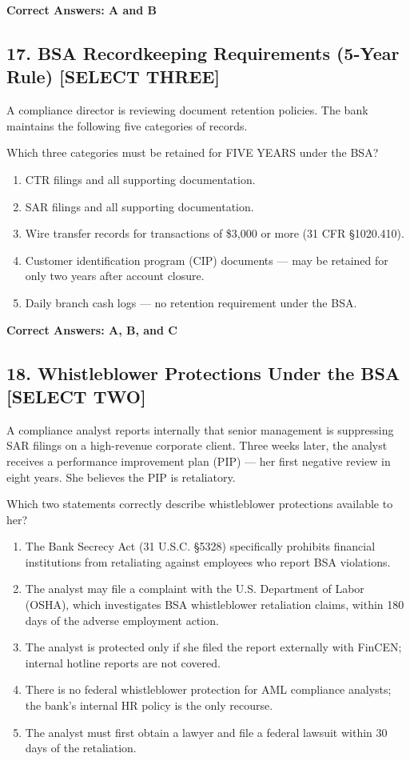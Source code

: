 \documentclass[11pt,a4paper]{article}
\begin{document}
	\textbf{Correct Answers: A and B}
	
	\subsection{17. BSA Recordkeeping Requirements (5-Year Rule) \textnormal{[SELECT THREE]}}
	
	A compliance director is reviewing document retention policies. The bank maintains the following five categories of records.
	
	Which three categories must be retained for FIVE YEARS under the BSA?
	
	\begin{enumerate}[label=\Alph*.]
		\item CTR filings and all supporting documentation.
		\item SAR filings and all supporting documentation.
		\item Wire transfer records for transactions of \$3,000 or more (31 CFR \S 1020.410).
		\item Customer identification program (CIP) documents — may be retained for only two years after account closure.
		\item Daily branch cash logs — no retention requirement under the BSA.
	\end{enumerate}
	
	\textbf{Correct Answers: A, B, and C}
	
	\subsection{18. Whistleblower Protections Under the BSA \textnormal{[SELECT TWO]}}
	
	A compliance analyst reports internally that senior management is suppressing SAR filings on a high-revenue corporate client. Three weeks later, the analyst receives a performance improvement plan (PIP) — her first negative review in eight years. She believes the PIP is retaliatory.
	
	Which two statements correctly describe whistleblower protections available to her?
	
	\begin{enumerate}[label=\Alph*.]
		\item The Bank Secrecy Act (31 U.S.C. \S 5328) specifically prohibits financial institutions from retaliating against employees who report BSA violations.
		\item The analyst may file a complaint with the U.S. Department of Labor (OSHA), which investigates BSA whistleblower retaliation claims, within 180 days of the adverse employment action.
		\item The analyst is protected only if she filed the report externally with FinCEN; internal hotline reports are not covered.
		\item There is no federal whistleblower protection for AML compliance analysts; the bank's internal HR policy is the only recourse.
		\item The analyst must first obtain a lawyer and file a federal lawsuit within 30 days of the retaliation.
	\end{enumerate}
	
\end{document}
